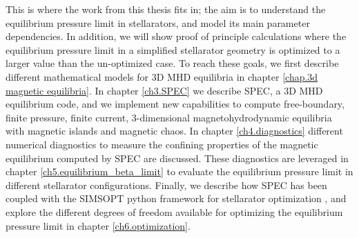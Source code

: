 \documentclass[my_thesis.tex]{subfiles}
\begin{document}
This is where the work from this thesis fits in; the aim  is to  understand the equilibrium pressure limit in stellarators, and model its main parameter dependencies. In addition, we will show proof of principle calculations where the equilibrium pressure limit in a simplified stellarator geometry is optimized to a larger value than the un-optimized case. To reach these goals, we first describe different mathematical models for 3D MHD equilibria in chapter \ref{chap.3d magnetic equilibria}. In chapter \ref{ch3.SPEC} we describe \ac{SPEC}, a 3D MHD equilibrium code, and we implement new capabilities to compute free-boundary, finite pressure, finite current, 3-dimensional magnetohydrodynamic equilibria with magnetic islands and magnetic chaos. In chapter \ref{ch4.diagnostics} different numerical diagnostics to measure the confining properties of the magnetic equilibrium computed by SPEC are discussed. These diagnostics are leveraged in chapter \ref{ch5.equilibrium_beta_limit} to evaluate the equilibrium pressure limit in different stellarator configurations. Finally, we describe how \ac{SPEC} has been coupled with the SIMSOPT python framework for stellarator optimization \citep{Landreman2021b}, and explore the different degrees of freedom available for optimizing the equilibrium pressure limit in chapter \ref{ch6.optimization}.


\end{document}
